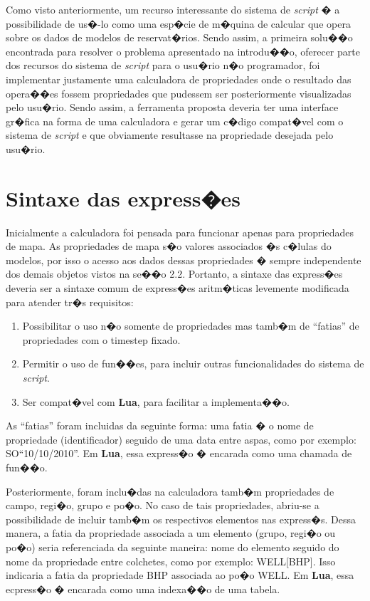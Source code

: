 \documentclass[dissertacao,modelo1,brazil]{ThesisPUC}
\newcommand{\script}{\emph{script}}
\begin{document}
Como visto anteriormente, um recurso interessante do sistema de \script{} � 
a possibilidade de us�-lo como uma esp�cie de m�quina de calcular que opera
sobre os dados de modelos de reservat�rios. Sendo assim, a primeira solu��o
encontrada para resolver o problema apresentado na introdu��o, oferecer
parte dos recursos do sistema de \script{} para o usu�rio n�o programador,
foi implementar justamente uma calculadora de propriedades onde o resultado
das opera��es fossem propriedades que pudessem ser posteriormente visualizadas pelo
usu�rio. Sendo assim, a ferramenta proposta deveria ter uma interface gr�fica
na forma de uma calculadora e gerar um c�digo compat�vel com o sistema
de \script{} e que obviamente resultasse na propriedade desejada pelo
usu�rio.

\section{Sintaxe das express�es}

Inicialmente a calculadora foi pensada para funcionar apenas para propriedades de
mapa. As propriedades de mapa s�o valores associados �s c�lulas do modelos, por
isso o acesso aos dados dessas propriedades � sempre independente dos demais
objetos vistos na se��o 2.2. Portanto, a sintaxe das express�es deveria ser
a sintaxe comum de express�es aritm�ticas levemente modificada para atender tr�s
requisitos: 

\begin{enumerate}
  \item Possibilitar o uso n�o somente de propriedades mas tamb�m de ``fatias'' 
  de propriedades com o timestep fixado.
  \item Permitir o uso de fun��es, para incluir outras funcionalidades do sistema
  de \script{}.
  \item Ser compat�vel com \textbf{Lua}, para facilitar a implementa��o.
\end{enumerate}

As ``fatias'' foram incluidas da seguinte forma: uma fatia � o nome de propriedade
(identificador) seguido de uma data entre aspas, como por exemplo:
 SO``10/10/2010''.
Em \textbf{Lua}, essa express�o � encarada como uma chamada de fun��o.

Posteriormente, foram  inclu�das na calculadora tamb�m propriedades de campo,
regi�o, grupo e po�o. No caso de tais propriedades, abriu-se a possibilidade de incluir
tamb�m os respectivos elementos nas express�s. Dessa manera, a fatia da propriedade associada
a um elemento (grupo, regi�o ou po�o) seria referenciada da seguinte maneira: nome
do elemento seguido do nome da propriedade entre colchetes, como por exemplo:
WELL[BHP]. Isso indicaria a fatia da propriedade BHP associada ao po�o WELL.
Em \textbf{Lua}, essa ecpress�o � encarada como uma indexa��o de uma tabela.
\end{document}
